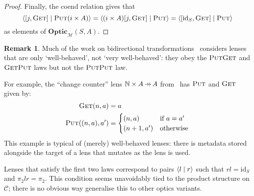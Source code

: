 \documentclass[11pt,letterpaper]{article}
\theoremstyle{plain}
\theoremstyle{definition}
\newtheorem{example}[theorem]{Example}
\newtheorem{remark}[theorem]{Remark}
\newcommand{\C}{\mathscr{C}}
\newcommand{\M}{\mathscr{M}}
\newcommand{\bN}{\mathbb{N}}
\newcommand{\Optic}{\mathbf{Optic}}
\newcommand{\id}{\mathrm{id}}
\newcommand{\rep}[2]{{\ensuremath \left\langle #1 \mid #2 \right\rangle}}
\newcommand{\fget}{\textsc{Get}}
\newcommand{\fput}{\textsc{Put}}
\newcommand{\hto}{\ensuremath{\,\mathaccent\shortmid\rightarrow\,}}
\begin{document}
\begin{proof}
  Finally, the coend relation gives that \[\rep{[j,\fget]}{\fput (i \times A)} = \rep{(i \times A)[j,\fget]}{\fput} = \rep{[\id_S, \fget]}{\fput}\] as elements of $\Optic_\M(S, A)$.
\end{proof}

\begin{remark}
Much of the work on bidirectional transformations~\cite{CombinatorsForBidirectionalTreeTransformations} considers lenses that are only `well-behaved', not `very well-behaved': they obey the $\fput\fget$ and $\fget\fput$ laws but not the $\fput\fput$ law.

For example, the ``change counter'' lens $\bN \times A \hto A$ from~\cite{AClearPictureOfLensLaws} has $\fput$ and $\fget$ given by:
  \begin{align*}
    \fget(n, a) &= a \\
    \fput((n, a), a') &= \begin{cases}
      (n, a) & \text{if } a = a' \\
      (n+1, a') & \text{otherwise}
    \end{cases}
  \end{align*}
  This example is typical of (merely) well-behaved lenses: there is metadata stored alongside the target of a lens that mutates as the lens is used.

Lenses that satisfy the first two laws correspond to pairs $\rep{l}{r}$ such that $rl = \id_S$ and $\pi_2lr = \pi_2$. This condition seems unavoidably tied to the product structure on $\C$; there is no obvious way generalise this to other optics variants.
\end{remark}

\end{document}
